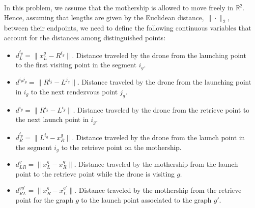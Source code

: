 

In this problem, we assume that the mothership is allowed to move freely in $\mathbb R^2$. Hence, assuming that lengths are given by the Euclidean distance, $\|\cdot\|_2$, between their endpoints, we need to define the following continuous variables that account for the distances among distinguished points:
\begin{itemize}
    \item $d_L^{i_g} = \|x_L^g - R^{i_g}\|$. Distance traveled by the drone from the launching point to the first visiting point in the segment $i_g$.
    \item $d^{i_gj_g} = \|R^{i_g} - L^{j_g}\|$. Distance traveled by the drone from the launching point in $i_g$ to the next rendezvous point $j_g$.
    \item $d^{i_g} = \|R^{i_g} - L^{i_g}\|$. Distance traveled by the drone from the retrieve point  to the next launch point in $i_g$.
    \item $d_R^{i_g} = \|L^{i_g} - x_R^g\|$. Distance traveled by the drone from the launch point in the segment $i_g$ to the retrieve point on the mothership.
    \item $d_{LR}^g = \|x_L^g - x_R^g\|$. Distance traveled by the mothership from the launch point to the retrieve point while the drone is visiting $g$.
    \item $d_{RL}^{gg'} = \|x_R^g - x_L^{g'}\|$. Distance traveled by the mothership from the retrieve point for the graph $g$ to the launch point associated to the graph $g'$.
\end{itemize}

